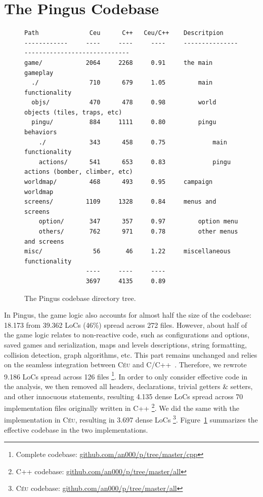 \documentclass{vgtc}                          %
\newcommand{\CEU}{\textsc{C\'{e}u}\xspace}
\begin{document}
\section{The Pingus Codebase}
\label{sec.codebase}

\begin{figure}[t]
\begin{verbatim}
Path              Ceu      C++   Ceu/C++    Descritpion
------------     ----     ----     ----     --------------------------------------------
game/            2064     2268     0.91     the main gameplay
  ./              710      679     1.05         main functionality
  objs/           470      478     0.98         world objects (tiles, traps, etc)
  pingu/          884     1111     0.80         pingu behaviors
    ./            343      458     0.75             main functionality
    actions/      541      653     0.83             pingu actions (bomber, climber, etc)
worldmap/         468      493     0.95     campaign worldmap
screens/         1109     1328     0.84     menus and screens
    option/       347      357     0.97         option menu
    others/       762      971     0.78         other menus and screens
misc/              56       46     1.22     miscellaneous functionality
                 ----     ----     ----
                 3697     4135     0.89
\end{verbatim}
\caption{The Pingus codebase directory tree.
\label{tab.tree}
}
\end{figure}

In Pingus, the game logic also accounts for almost half the size of the
codebase: 18.173 from 39.362 LoCs (46\%) spread across 272 files.
%
However, about half of the game logic relates to non-reactive code, such as
configurations and options, saved games and serialization, maps and levels
descriptions, string formatting, collision detection, graph algorithms, etc.
This part remains unchanged and relies on the seamless integration between \CEU
and C/C++~\cite{ceu.sensys13}.
%
Therefore, we rewrote 9.186 LoCs spread across 126 files%
\footnote{Complete codebase: \url{github.com/an000/p/tree/master/cpp}}.
%
In order to only consider effective code in the analysis, we then removed all
headers, declarations, trivial getters \& setters, and other innocuous
statements, resulting 4.135 dense LoCs spread across 70 implementation files
originally written in C++%
\footnote{C++ codebase: \url{github.com/an000/p/tree/master/all}}.
We did the same with the implementation in \CEU, resulting in 3.697 dense LoCs%
\footnote{\CEU codebase: \url{github.com/an000/p/tree/master/all}}.
%
Figure~\ref{tab.tree} summarizes the effective codebase in the two
implementations.
\end{document}
